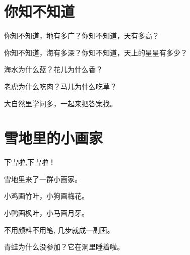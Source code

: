 \documentclass[12pt,UTF-8,openany]{ctexbook}
\begin{document}
\chapter{你知不知道}

\begin{large}
    
    你知不知道，地有多广？你知不知道，天有多高？
    
    你知不知道，海有多深？你知不知道，天上的星星有多少？
    
    海水为什么蓝？花儿为什么香？
    
    老虎为什么吃肉？马儿为什么吃草？
    
    大自然里学问多，一起来把答案找。
    
\end{large}


\clearpage

\begin{center}
    
    
\end{center}


\hanzibox{}\hanzibox{}\hanzibox{}\hanzibox{}\hspace{1em}\hanzibox{}\hanzibox{}\hanzibox{}\hanzibox{}

\hanzibox{}\hanzibox{}\hanzibox{}\hanzibox{}\hspace{1em}\hanzibox{}\hanzibox{}\hanzibox{}\hanzibox{}

\hanzibox{}\hanzibox{}\hanzibox{}\hanzibox{}\hspace{1em}\hanzibox{}\hanzibox{}\hanzibox{}\hanzibox{}

\hanzibox{}\hanzibox{}\hanzibox{}\hanzibox{}\hspace{1em}\hanzibox{}\hanzibox{}\hanzibox{}\hanzibox{}






\chapter{雪地里的小画家}

\begin{large}
    
    下雪啦,下雪啦！
    
    雪地里来了一群小画家。
    
    小鸡画竹叶，小狗画梅花。
    
    小鸭画枫叶，小马画月牙。
    
    不用颜料不用笔, 几步就成一副画。
    
    青蛙为什么没参加？它在洞里睡着啦。
    
\end{large}
\end{document}

